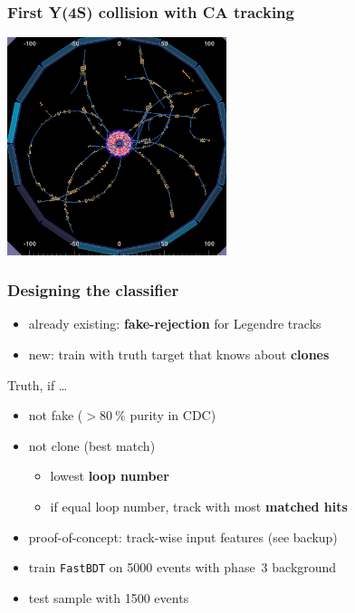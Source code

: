 \documentclass[18pt, aspectratio=169]{beamer}
\begin{document}
\begin{frame}
  \frametitle{First Y(4S) collision with CA tracking}
  \begin{center}
    \includegraphics[width=0.48\textwidth]{figures/first_y4s_ca.png}
  \end{center}
\end{frame}

\begin{frame}
  \frametitle{Designing the classifier}
  \begin{itemize}
  \item already existing: \textbf{fake-rejection} for Legendre tracks\\
  \item new: train with truth target that knows about \textbf{clones}
  \end{itemize}
  \begin{block}{Truth, if \ldots}
    \begin{itemize}
    \item not fake ($ > \SI{80}{\percent}$ purity in CDC)
    \item not clone (best match)
      \begin{itemize}
      \item lowest \textbf{loop number}
      \item if equal loop number, track with most \textbf{matched hits}
      \end{itemize}
    \end{itemize}

  \end{block}
  \begin{itemize}
  \item proof-of-concept: track-wise input features (see backup)
  \item train \texttt{FastBDT} on 5000 events with phase~3 background
  \item test sample with 1500 events
  \end{itemize}
\end{frame}
\end{document}
